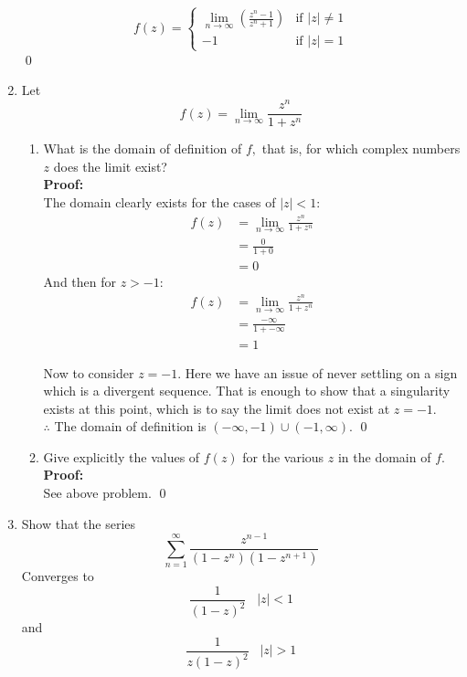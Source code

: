 \begin{enumerate}
	\[	
	f(z) =
	\begin{cases}
		\lim_{n \to \infty} \left( \frac{z^n - 1}{z^n + 1} \right) & \text{if } |z| \not = 1 \\
		-1 & \text{if } |z| = 1
	\end{cases} 
	\]
	\qed

	\item Let \[ f(z) = \lim_{n \to \infty} \frac{z^n}{1 + z^n} \]
	\begin{enumerate}
		\item What is the domain of definition of $f,$ that is, for which complex numbers $z$ does the limit exist? \\
		
		\textbf{Proof:} \\ 
		The domain clearly exists for the cases of $|z| < 1$: 
		\begin{align*}
			f(z) &= \lim_{n \to \infty} \frac{z^n}{1 + z^n} \\
			&= \frac{0}{1 + 0} \\
			&= 0
		\end{align*}
		And then for $z > -1$:
		\begin{align*}
			f(z) &= \lim_{n \to \infty} \frac{z^n}{1 + z^n} \\
			&= \frac{-\infty}{1 + -\infty} \\
			&= 1
		\end{align*}

		Now to consider $z = -1$. Here we have an issue of never settling on a sign which is a divergent sequence.
		That is enough to show that a singularity exists at this point, 
		which is to say the limit does not exist at $z = -1$.  \\

		$\therefore$ The domain of definition is $(-\infty, -1) \cup (-1, \infty)$.
		\qed
	
		\item Give explicitly the values of $f(z)$ for the various $z$ in the domain of $f.$ \\
		
		\textbf{Proof:} \\
		See above problem. \qed
	
	\end{enumerate}

	\item Show that the series
	\[ \sum_{n = 1}^{\infty} \frac{z^{n - 1}}{(1 - z^n )(1 - z^{n + 1})} \]
	Converges to
	\[ \frac{1}{(1 - z)^2 } \;\;\; |z| < 1 \]
	and
	\[\frac{1}{z(1 - z)^2 } \;\;\; |z| > 1\]


\end{enumerate}
